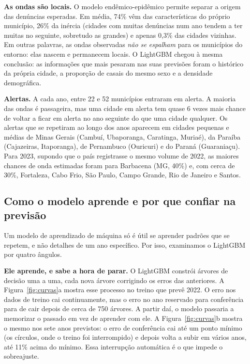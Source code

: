 \documentclass[12pt]{article}
\begin{document}
\textbf{As ondas são locais.} O modelo endêmico-epidêmico permite separar a origem das denúncias esperadas. Em média, 74\% vêm das características do próprio município, 26\% da inércia (cidades com muitas denúncias num ano tendem a ter muitas no seguinte, sobretudo as grandes) e apenas 0,3\% das cidades vizinhas. Em outras palavras, as ondas observadas \textit{não se espalham} para os municípios do entorno: elas nascem e permanecem locais. O LightGBM chegou à mesma conclusão: as informações que mais pesaram nas suas previsões foram o histórico da própria cidade, a proporção de casais do mesmo sexo e a densidade demográfica.

\textbf{Alertas.} A cada ano, entre 22 e 52 municípios entraram em alerta. A maioria das ondas é passageira, mas uma cidade em alerta tem quase 6 vezes mais chance de voltar a ficar em alerta no ano seguinte do que uma cidade qualquer. Os alertas que se repetiram ao longo dos anos aparecem em cidades pequenas e médias de Minas Gerais (Cambuí, Ubaporanga, Caratinga, Muriaé), da Paraíba (Cajazeiras, Itaporanga), de Pernambuco (Ouricuri) e do Paraná (Guaraniaçu). Para 2023, supondo que o país registrasse o mesmo volume de 2022, as maiores chances de onda estimadas foram para Barbacena (MG, 40\%) e, com cerca de 30\%, Fortaleza, Cabo Frio, São Paulo, Campo Grande, Rio de Janeiro e Santos.

\subsection{Como o modelo aprende e por que confiar na previsão}

Um modelo de aprendizado de máquina só é útil se aprender padrões que se repetem, e não detalhes de um ano específico. Por isso, examinamos o LightGBM por quatro ângulos.

\textbf{Ele aprende, e sabe a hora de parar.} O LightGBM constrói árvores de decisão uma a uma, cada nova árvore corrigindo os erros das anteriores. A Figura~\ref{fig:curvas}a mostra esse processo no treino que prevê 2022. O erro nos dados de treino cai continuamente, mas o erro no ano reservado para conferência para de cair depois de cerca de 750 árvores. A partir daí, o modelo passaria a memorizar o passado em vez de aprender com ele. A Figura~\ref{fig:curvas}b mostra o mesmo nos sete anos previstos: o erro de conferência cai até um ponto mínimo (os círculos, onde o treino foi interrompido) e depois volta a subir em vários anos, até 11\% acima do mínimo. Essa interrupção automática é o que impede o sobreajuste.
\end{document}
